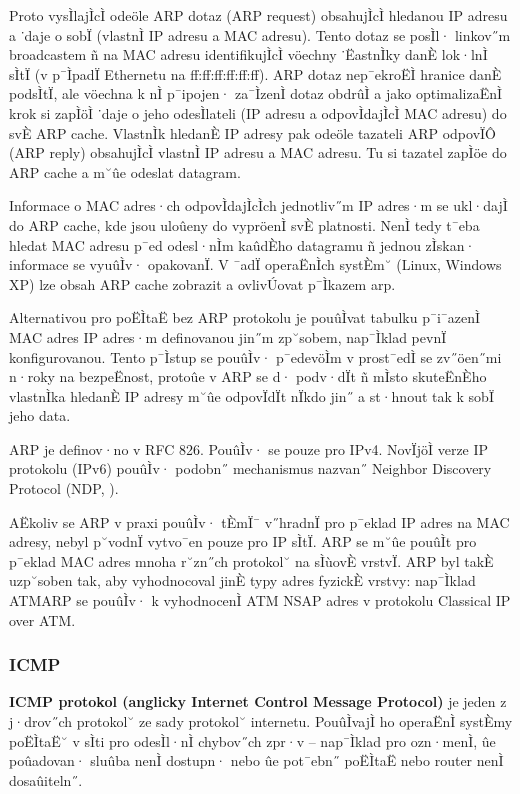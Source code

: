 Proto vysÌlajÌcÌ odeöle ARP dotaz (ARP request) obsahujÌcÌ hledanou IP adresu a ˙daje o sobÏ (vlastnÌ IP adresu a MAC adresu). Tento dotaz se posÌl· linkov˝m broadcastem ñ na MAC adresu identifikujÌcÌ vöechny ˙ËastnÌky danÈ lok·lnÌ sÌtÏ (v p¯ÌpadÏ Ethernetu na ff:ff:ff:ff:ff:ff). ARP dotaz nep¯ekroËÌ hranice danÈ podsÌtÏ, ale vöechna k nÌ p¯ipojen· za¯ÌzenÌ dotaz obdrûÌ a jako optimalizaËnÌ krok si zapÌöÌ ˙daje o jeho odesÌlateli (IP adresu a odpovÌdajÌcÌ MAC adresu) do svÈ ARP cache. VlastnÌk hledanÈ IP adresy pak odeöle tazateli ARP odpovÏÔ (ARP reply) obsahujÌcÌ vlastnÌ IP adresu a MAC adresu. Tu si tazatel zapÌöe do ARP cache a m˘ûe odeslat datagram.

Informace o MAC adres·ch odpovÌdajÌcÌch jednotliv˝m IP adres·m se ukl·dajÌ do ARP cache, kde jsou uloûeny do vypröenÌ svÈ platnosti. NenÌ tedy t¯eba hledat MAC adresu p¯ed odesl·nÌm kaûdÈho datagramu ñ jednou zÌskan· informace se vyuûÌv· opakovanÏ. V ¯adÏ operaËnÌch systÈm˘ (Linux, Windows XP) lze obsah ARP cache zobrazit a ovlivÚovat p¯Ìkazem arp.

Alternativou pro poËÌtaË bez ARP protokolu je pouûÌvat tabulku p¯i¯azenÌ MAC adres IP adres·m definovanou jin˝m zp˘sobem, nap¯Ìklad pevnÏ konfigurovanou. Tento p¯Ìstup se pouûÌv· p¯edevöÌm v prost¯edÌ se zv˝öen˝mi n·roky na bezpeËnost, protoûe v ARP se d· podv·dÏt ñ mÌsto skuteËnÈho vlastnÌka hledanÈ IP adresy m˘ûe odpovÏdÏt nÏkdo jin˝ a st·hnout tak k sobÏ jeho data.

ARP je definov·no v RFC 826. PouûÌv· se pouze pro IPv4. NovÏjöÌ verze IP protokolu (IPv6) pouûÌv· podobn˝ mechanismus nazvan˝ Neighbor Discovery Protocol (NDP, ).

AËkoliv se ARP v praxi pouûÌv· tÈmÏ¯ v˝hradnÏ pro p¯eklad IP adres na MAC adresy, nebyl p˘vodnÏ vytvo¯en pouze pro IP sÌtÏ. ARP se m˘ûe pouûÌt pro p¯eklad MAC adres mnoha r˘zn˝ch protokol˘ na sÌùovÈ vrstvÏ. ARP byl takÈ uzp˘soben tak, aby vyhodnocoval jinÈ typy adres fyzickÈ vrstvy: nap¯Ìklad ATMARP se pouûÌv· k vyhodnocenÌ ATM NSAP adres v protokolu Classical IP over ATM.

\subsubsection*{ICMP}

\textbf{ICMP protokol (anglicky Internet Control Message Protocol)} je jeden z j·drov˝ch protokol˘ ze sady protokol˘ internetu. PouûÌvajÌ ho operaËnÌ systÈmy poËÌtaË˘ v sÌti pro odesÌl·nÌ chybov˝ch zpr·v -- nap¯Ìklad pro ozn·menÌ, ûe poûadovan· sluûba nenÌ dostupn· nebo ûe pot¯ebn˝ poËÌtaË nebo router nenÌ dosaûiteln˝.

